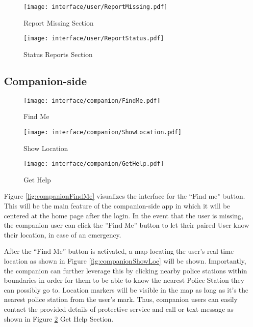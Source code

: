 \begin{figure}[!h]
    \centering
    \begin{minipage}[c]{0.50\linewidth}
        \centering
        \texttt{[image: interface/user/ReportMissing.pdf]}
        \caption{Report Missing Section}
        \label{fig:userReportMP}
    \end{minipage}\hfill
    \centering
    \begin{minipage}[c]{0.50\linewidth}
        \centering
        \texttt{[image: interface/user/ReportStatus.pdf]}
        \caption{Status Reports Section}
        \label{fig:userReportStatus}
    \end{minipage}
\end{figure}

\subsection{Companion-side}

\begin{figure}[t]
    \centering
    \begin{minipage}[c]{0.50\linewidth}
        \centering
    \texttt{[image: interface/companion/FindMe.pdf]}
    \caption{Find Me}
    \label{fig:companionFindMe}
    \end{minipage}\hfill
    \centering
    \begin{minipage}[c]{0.50\linewidth}
        \centering
        \texttt{[image: interface/companion/ShowLocation.pdf]}
        \caption{Show Location}
        \label{fig:companionShowLoc}
    \end{minipage}\hfill
    \centering
    \begin{minipage}[c]{0.50\linewidth}
        \centering
        \texttt{[image: interface/companion/GetHelp.pdf]}
        \caption{Get Help}
        \label{fig:companionGetHelp}
    \end{minipage}
\end{figure}
Figure \ref{fig:companionFindMe} visualizes the interface for the “Find me” button. This will be the main feature of the companion-side app in which it will be centered at the home page after the login. In the event that the user is missing, the companion user can click the ”Find Me” button to let their paired User know their location, in case of an emergency. 

After the  “Find Me” button is activated, a map locating the user’s real-time location as shown in Figure \ref{fig:companionShowLoc} will be shown. Importantly, the companion can further leverage this by clicking nearby police stations within boundaries in order for them to be able to know the nearest Police Station they can possibly go to. Location markers will be visible in the map as long as it's the nearest police station from the user’s mark. Thus, companion users can easily contact the provided details of protective service and call or text message as shown in Figure \ref{fig:companionGetHelp} Get Help Section.